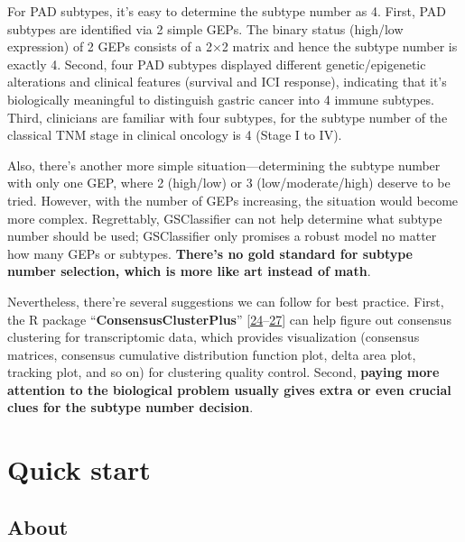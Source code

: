 \documentclass[
  12pt,
]{book}
\begin{document}
For PAD subtypes, it's easy to determine the subtype number as 4. First, PAD subtypes are identified via 2 simple GEPs. The binary status (high/low expression) of 2 GEPs consists of a 2×2 matrix and hence the subtype number is exactly 4. Second, four PAD subtypes displayed different genetic/epigenetic alterations and clinical features (survival and ICI response), indicating that it's biologically meaningful to distinguish gastric cancer into 4 immune subtypes. Third, clinicians are familiar with four subtypes, for the subtype number of the classical TNM stage in clinical oncology is 4 (Stage I to IV).

Also, there's another more simple situation---determining the subtype number with only one GEP, where 2 (high/low) or 3 (low/moderate/high) deserve to be tried. However, with the number of GEPs increasing, the situation would become more complex. Regrettably, GSClassifier can not help determine what subtype number should be used; GSClassifier only promises a robust model no matter how many GEPs or subtypes. \textbf{There's no gold standard for subtype number selection, which is more like art instead of math}.

Nevertheless, there're several suggestions we can follow for best practice. First, the R package ``\textbf{ConsensusClusterPlus}'' {[}\protect\hyperlink{ref-RN421}{24}--\protect\hyperlink{ref-RN424}{27}{]} can help figure out consensus clustering for transcriptomic data, which provides visualization (consensus matrices, consensus cumulative distribution function plot, delta area plot, tracking plot, and so on) for clustering quality control. Second, \textbf{paying more attention to the biological problem usually gives extra or even crucial clues for the subtype number decision}.

\hypertarget{quick-start}{%
\chapter{Quick start}\label{quick-start}}

\hypertarget{about-1}{%
\section{About}\label{about-1}}
\end{document}
